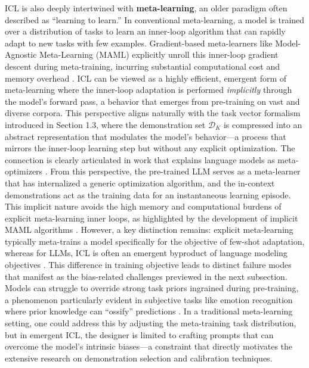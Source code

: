 \documentclass[11pt]{article}
\begin{document}
ICL is also deeply intertwined with \textbf{meta-learning}, an older paradigm often described as ``learning to learn.'' In conventional meta-learning, a model is trained over a distribution of tasks to learn an inner-loop algorithm that can rapidly adapt to new tasks with few examples. Gradient-based meta-learners like Model-Agnostic Meta-Learning (MAML) explicitly unroll this inner-loop gradient descent during meta-training, incurring substantial computational cost and memory overhead \cite{ref27}. ICL can be viewed as a highly efficient, emergent form of meta-learning where the inner-loop adaptation is performed \emph{implicitly} through the model's forward pass, a behavior that emerges from pre-training on vast and diverse corpora. This perspective aligns naturally with the task vector formalism introduced in Section 1.3, where the demonstration set \(\mathcal{D}_K\) is compressed into an abstract representation that modulates the model's behavior---a process that mirrors the inner-loop learning step but without any explicit optimization. The connection is clearly articulated in work that explains language models as meta-optimizers \cite{ref25}. From this perspective, the pre-trained LLM serves as a meta-learner that has internalized a generic optimization algorithm, and the in-context demonstrations act as the training data for an instantaneous learning episode. This implicit nature avoids the high memory and computational burdens of explicit meta-learning inner loops, as highlighted by the development of implicit MAML algorithms \cite{ref27}. However, a key distinction remains: explicit meta-learning typically meta-trains a model specifically for the objective of few-shot adaptation, whereas for LLMs, ICL is often an emergent byproduct of language modeling objectives \cite{ref28}. This difference in training objective leads to distinct failure modes that manifest as the bias-related challenges previewed in the next subsection. Models can struggle to override strong task priors ingrained during pre-training, a phenomenon particularly evident in subjective tasks like emotion recognition where prior knowledge can ``ossify'' predictions \cite{ref29}. In a traditional meta-learning setting, one could address this by adjusting the meta-training task distribution, but in emergent ICL, the designer is limited to crafting prompts that can overcome the model's intrinsic biases---a constraint that directly motivates the extensive research on demonstration selection and calibration techniques.
\end{document}
